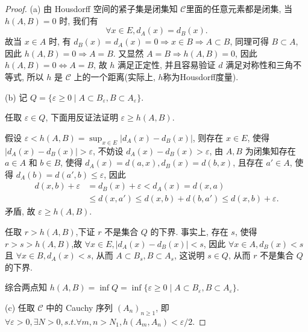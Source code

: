 \begin{proof}
    (a) 由 Housdorff 空间的紧子集是闭集知 $\mathcal{C}$里面的任意元素都是闭集,
    当 $h(A,B)=0$ 时, 我们有
    \[\forall x\in E,d_A(x)=d_B(x).\]
    故当 $x\in A$ 时, 有 $d_B(x)=d_A(x)=0\Rightarrow x\in B\Rightarrow A\subset B$, 
    同理可得 $B\subset A$, 因此 $h(A,B)=0\Rightarrow A=B$.
    又显然 $A=B\Rightarrow h(A,B)=0$, 因此$h(A,B)=0\Leftrightarrow A=B$,
    故 $h$ 满足正定性, 并且容易验证 $d$ 满足对称性和三角不等式,
    所以 $h$ 是 $\mathcal{C}$ 上的一个距离(实际上, $h$称为Housdorff度量).

    (b) 记 $Q=\{\varepsilon\geq 0\mid A\subset B_\varepsilon, B\subset A_\varepsilon\}$.

    任取 $\varepsilon\in Q$, 下面用反证法证明 $\varepsilon\geq h(A,B)$.

    假设 $\varepsilon <h(A,B)=\sup_{x\in E}|d_A(x)-d_B(x)|$,
    则存在 $x\in E$, 使得 $|d_A(x)-d_B(x)|>\varepsilon$,
    不妨设 $d_A(x)-d_B(x)>\varepsilon$,
    由 $A,B$ 为闭集知存在 $a\in A$ 和 $b\in B$, 使得 $d_A(x)=d(a,x),d_B(x)=d(b,x)$,
    且存在 $a'\in A$, 使得 $d_A(b)=d(a',b)\leq\varepsilon$,
    因此
    \begin{align*}
        d(x,b)+\varepsilon 
        &=d_B(x)+\varepsilon <d_A(x)=d(x,a) \\
        &\leq d(x,a')\leq d(x,b)+d(b,a')\leq d(x,b)+\varepsilon.
    \end{align*}
    矛盾, 故 $\varepsilon\geq h(A,B)$.

    任取 $r>h(A,B)$,下证 $r$ 不是集合 $Q$ 的下界.
    事实上, 存在 $s$, 使得 $r>s>h(A,B)$,故 $\forall x\in E,|d_A(x)-d_B(x)|<s$,
    因此 $\forall x\in A,d_B(x)<s$ 且 $\forall x\in B,d_A(x)<s$,
    从而 $A\subset B_s,B\subset A_s$, 这说明 $s\in Q$, 从而 $r$ 不是集合 $Q$ 的下界.

    综合两点知 $h(A,B)=\inf Q=\inf\{\varepsilon\geq 0\mid A\subset B_{\varepsilon}, B\subset A_{\varepsilon}\}$.

    (c) 任取 $\mathcal{C}$ 中的 Cauchy 序列 $(A_n)_{n\geq 1}$,
    即 $\forall\varepsilon >0,\exists N>0,s.t.\forall m,n>N_1,h(A_m,A_n)<\varepsilon /2$.


\end{proof}
